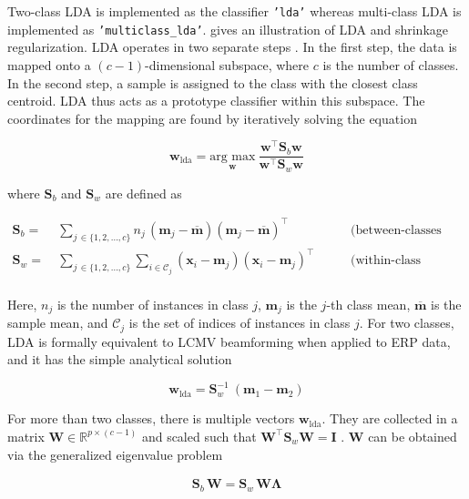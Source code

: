\documentclass[utf8]{frontiersSCNS} %
\newcommand{\m}{\mathbf{m}}
\newcommand{\mbar}{\overline{\m}}
\newcommand{\mm}[1]{\m_{#1}}
\newcommand{\w}{\mathbf{w}}
\newcommand{\x}{\mathbf{x}}
\newcommand{\I}{\mathbf{I}}
\newcommand{\R}{\mathbb{R}}
\renewcommand{\S}{\mathbf{S}}
\newcommand{\W}{\mathbf{W}}
\newcommand{\ttt}[1]{\texttt{#1}}
\begin{document}
Two-class LDA is implemented as the classifier \ttt{'lda'} whereas multi-class LDA is implemented as \texttt{'multiclass\_lda'}.  gives an illustration of LDA and shrinkage regularization. LDA operates in two separate steps \citep{Fisher1936}. In the first step, the data is mapped onto a $(c-1)$-dimensional subspace, where $c$ is the number of classes. In the second step, a sample is assigned to the class with the closest class centroid. LDA thus acts as a prototype classifier within this subspace. The coordinates for the mapping are found by iteratively solving the equation

\begin{equation}
\label{eq:fda}
\w_{\text{lda}} = \underset{\w}{\text{arg max}}\ \frac{\w^\top \S_b\w}{\w^\top \S_w\w}
\end{equation}

where $\S_b$ and $\S_w$ are defined as

\begin{equation*}
\begin{alignedat}{2}
\S_b =\ & \sum_{j\,\in\{1,2,...,c\}}n_j\,(\mm{j} -\mbar) (\mm{j} - \mbar)^\top\ \quad &&\text{(between-classes scatter)}\\
\S_w =\ & \sum_{j\,\in\{1,2,...,c\}}\sum_{i\in\mathcal{C}_j} (\x_i - \mm{j})(\x_i - \mm{j})^\top\  \quad &&\text{(within-class scatter)}\\
\end{alignedat}
\end{equation*}

Here, $n_j$ is the number of instances in class $j$, $\m_j$ is the $j$-th class mean, $\mbar$ is the sample mean, and $\mathcal{C}_j$ is the set of indices of instances in class $j$. For two classes, LDA is formally equivalent to LCMV beamforming \citep{Treder2016} when applied to ERP data, and it has the simple analytical solution 

\begin{equation}
\label{eq:lda_solution}
\w_{\text{lda}} = \S_w^{-1}\ (\m_1 - \m_2)
\end{equation}

For more than two classes, there is multiple vectors $\w_{\text{lda}}$. They are collected in a matrix $\W\in\R^{p\times(c-1)}$ and scaled such that $\W^\top\S_w\W = \I$ \citep{Bishop2007}. $\W$ can be obtained via the generalized eigenvalue problem

\begin{align}
\label{eq:LDA-eigenvalue-multiclass}
\S_b\,\W = \S_w\,\W\mathbf{\Lambda}
\end{align}
\end{document}
